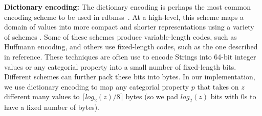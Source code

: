 \noindent \textbf{Dictionary encoding:} The dictionary encoding is perhaps the most common encoding scheme to be used in \gls{rdbms}s~\cite{abadi-col-comp, boncz-comp}. At a high-level, this scheme maps a domain of values into more compact and shorter representations using a variety of schemes \cite{boncz-comp, dat-comp, abadi-col-comp}. Some of these schemes produce variable-length codes, such as Huffmann encoding, and others use fixed-length codes, such as the one described in reference\cite{abadi-col-comp}. These techniques are often use to encode Strings into 64-bit integer values or any categorial property into a small number of fixed-length bits. Different schemes can further pack these bits into bytes. In our implementation, we use dictionary encoding to map any categorial property $p$ that takes on $z$ different many values to  $\lceil log_2(z)/8 \rceil$ bytes (so we pad $log_2(z)$ bits with 0s to have a fixed number of bytes).
	
	
